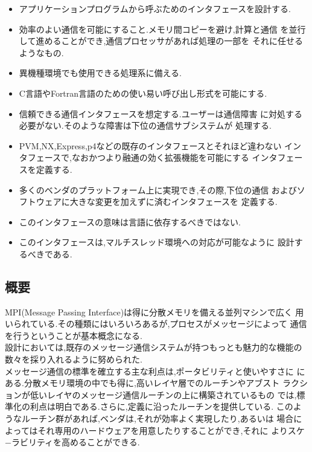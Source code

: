 \documentclass[a4paper,titlepage]{jreport}
\begin{document}
\begin{itemize}
\item アプリケーションプログラムから呼ぶためのインタフェースを設計する.
\item 効率のよい通信を可能にすること.メモリ間コピーを避け,計算と通信
      を並行して進めることができ,通信プロセッサがあれば処理の一部を
      それに任せるようなもの.
\item 異機種環境でも使用できる処理系に備える.
\item C言語やFortran言語のための使い易い呼び出し形式を可能にする.
\item 信頼できる通信インタフェースを想定する.ユーザーは通信障害
      に対処する必要がない.そのような障害は下位の通信サブシステムが
      処理する.
\item PVM,NX,Express,p4などの既存のインタフェースとそれほど違わない
      インタフェースで,なおかつより融通の効く拡張機能を可能にする
      インタフェースを定義する.
\item 多くのベンダのプラットフォーム上に実現でき,その際,下位の通信
      およびソフトウェアに大きな変更を加えずに済むインタフェースを
      定義する.
\item このインタフェースの意味は言語に依存するべきではない.
\item このインタフェースは,マルチスレッド環境への対応が可能なように
      設計するべきである.
\end{itemize}

\subsection{概要}
MPI(Message Passing Interface)は得に分散メモリを備える並列マシンで広く
用いられている.その種類にはいろいろあるが,プロセスがメッセージによって
通信を行うということが基本概念になる.\\

設計においては,既存のメッセージ通信システムが持つもっとも魅力的な機能の
数々を採り入れるように努められた.\\

メッセージ通信の標準を確立する主な利点は,ポータビリティと使いやすさに
にある.分散メモリ環境の中でも得に,高いレイヤ層でのルーチンやアブスト
ラクションが低いレイヤのメッセージ通信ルーチンの上に構築されているもの
では,標準化の利点は明白である.さらに,定義に沿ったルーチンを提供している.
このようなルーチン群があれば,ベンダは,それが効率よく実現したり,あるいは
場合によってはそれ専用のハードウェアを用意したりすることができ,それに
よりスケ−ラビリティを高めることができる.
\end{document}
